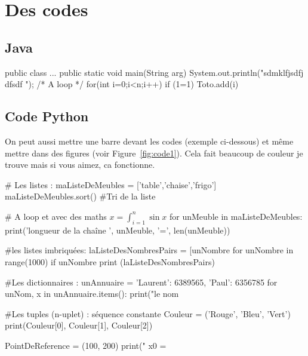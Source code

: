 

\section{Des codes}


\subsection{Java}


\begin{java}
public class {
	...
	public static void main(String arg){
		System.out.println("sdmklfjsdfj dfsdf ");
		/* A loop */
		for(int i=0;i<n;i++)
			if (1=1)
				Toto.add(i)
	}
}
\end{java}


\subsection{Code Python}


On peut aussi mettre une barre devant les codes (exemple ci-dessous) et même
mettre dans des figures (voir Figure~\ref{fig:code1}). Cela fait beaucoup de couleur je trouve mais si vous aimez, ca fonctionne.

\begin{code}
\begin{python}
# Les listes :
maListeDeMeubles = ['table','chaise','frigo']
maListeDeMeubles.sort()  #Tri de la liste

# A loop et avec des maths $x=\int_{i=1}^n \sin{x}$
for unMeuble in maListeDeMeubles:
   print('longueur de la chaîne ', unMeuble, '=', len(unMeuble))

#les listes imbriquées:
laListeDesNombresPairs = [unNombre for unNombre in range(1000) if unNombre %
print (laListeDesNombresPairs)

#Les dictionnaires :
unAnnuaire = {'Laurent': 6389565, 'Paul': 6356785}
for unNom, x in unAnnuaire.items():
   print("le nom %


#Les tuples (n-uplet) : séquence constante
Couleur = ('Rouge', 'Bleu', 'Vert')
print(Couleur[0], Couleur[1],  Couleur[2])

PointDeReference = (100, 200)
print(" x0 = %
\end{python}
\end{code}


